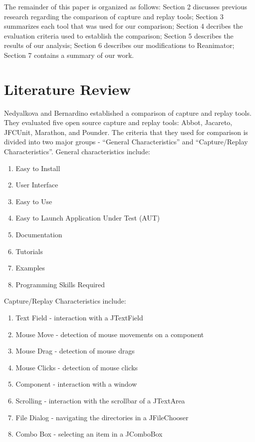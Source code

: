 \documentclass[12pt,journal]{IEEEtran}
\begin{document}
\par
The remainder of this paper is organized as follows: Section 2 discusses previous research regarding the comparison of capture and replay tools; Section 3 summarizes each tool that was used for our comparison; Section 4 decribes the evaluation criteria used to establish the comparison; Section 5 describes the results of our analysis; Section 6 describes our modifications to Reanimator; Section 7 contains a summary of our work.

\section{Literature Review}
Nedyalkova and Bernardino \cite{Nedyalkova:2013:OSC:2494444.2494464} established a comparison of capture and replay tools. They evaluated five open source capture and replay tools: Abbot, Jacareto, JFCUnit, Marathon, and Pounder. The criteria that they used for comparison is divided into two major groups - ``General Characteristics'' and ``Capture/Replay Characteristics''. General characteristics include:
\begin{enumerate}
\item Easy to Install
\item User Interface
\item Easy to Use
\item Easy to Launch Application Under Test (AUT)
\item Documentation
\item Tutorials
\item Examples
\item Programming Skills Required
\end{enumerate}
Capture/Replay Characteristics include:
\begin{enumerate}
\item Text Field - interaction with a JTextField
\item Mouse Move - detection of mouse movements on a component
\item Mouse Drag - detection of mouse drags
\item Mouse Clicks - detection of mouse clicks
\item Component - interaction with a window
\item Scrolling - interaction with the scrollbar of a JTextArea
\item File Dialog - navigating the directories in a JFileChooser
\item Combo Box - selecting an item in a JComboBox
\end{enumerate}
\end{document}
